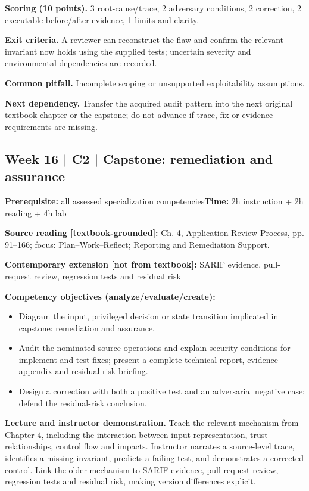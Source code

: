\documentclass[10pt,letterpaper]{article}
\begin{document}
\textbf{Scoring (10 points).} 3 root-cause/trace, 2 adversary conditions, 2 correction, 2 executable before/after evidence, 1 limits and clarity.

\textbf{Exit criteria.} A reviewer can reconstruct the flaw and confirm the relevant invariant now holds using the supplied tests; uncertain severity and environmental dependencies are recorded.

\textbf{Common pitfall.} Incomplete scoping or unsupported exploitability assumptions.

\textbf{Next dependency.} Transfer the acquired audit pattern into the next original textbook chapter or the capstone; do not advance if trace, fix or evidence requirements are missing.

\subsection{Week 16 | C2 | Capstone: remediation and assurance}
\textbf{Prerequisite:} all assessed specialization competencies\hfill\textbf{Time:} 2h instruction + 2h reading + 4h lab

\textbf{Source reading [textbook-grounded]:} Ch. 4, Application Review Process, pp. 91--166; focus: Plan--Work--Reflect; Reporting and Remediation Support.

\textbf{Contemporary extension [not from textbook]:} SARIF evidence, pull-request review, regression tests and residual risk

\textbf{Competency objectives (analyze/evaluate/create):}
\begin{itemize}[leftmargin=*,itemsep=2pt]
\item Diagram the input, privileged decision or state transition implicated in capstone: remediation and assurance.
\item Audit the nominated source operations and explain security conditions for implement and test fixes; present a complete technical report, evidence appendix and residual-risk briefing.
\item Design a correction with both a positive test and an adversarial negative case; defend the residual-risk conclusion.
\end{itemize}
\textbf{Lecture and instructor demonstration.} Teach the relevant mechanism from Chapter 4, including the interaction between input representation, trust relationships, control flow and impacts. Instructor narrates a source-level trace, identifies a missing invariant, predicts a failing test, and demonstrates a corrected control. Link the older mechanism to SARIF evidence, pull-request review, regression tests and residual risk, making version differences explicit.
\end{document}
